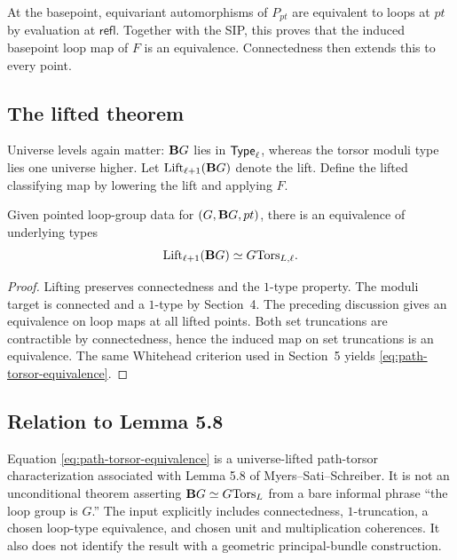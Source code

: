 At the basepoint, equivariant automorphisms of $P_{pt}$ are equivalent to loops at $pt$ by evaluation at $\mathsf{refl}$. Together with the SIP, this proves that the induced basepoint loop map of $F$ is an equivalence. Connectedness then extends this to every point.


\subsection{The lifted theorem}
Universe levels again matter: $\mathbf{B}G$ lies in $\mathsf{Type}_\ell$, whereas the torsor moduli type lies one universe higher. Let $\operatorname{Lift}_{\ell+1}(\mathbf{B}G)$ denote the lift. Define the lifted classifying map by lowering the lift and applying $F$.

\begin{theorem}
\label{thm:path-torsor}
Given pointed loop-group data for $(G,\mathbf{B}G,pt)$, there is an equivalence of underlying types
\begin{equation}
\operatorname{Lift}_{\ell+1}(\mathbf{B}G)\simeq G\mathrm{Tors}_{L,\ell}.
\label{eq:path-torsor-equivalence}
\end{equation}
\end{theorem}
\begin{proof}
Lifting preserves connectedness and the $1$-type property. The moduli target is connected and a $1$-type by Section~4. The preceding discussion gives an equivalence on loop maps at all lifted points. Both set truncations are contractible by connectedness, hence the induced map on set truncations is an equivalence. The same Whitehead criterion used in Section~5 yields \eqref{eq:path-torsor-equivalence}.
\end{proof}


\subsection{Relation to Lemma 5.8}
Equation \eqref{eq:path-torsor-equivalence} is a universe-lifted path-torsor characterization associated with Lemma 5.8 of Myers--Sati--Schreiber. It is not an unconditional theorem asserting $\mathbf{B}G\simeq G\mathrm{Tors}_{L}$ from a bare informal phrase ``the loop group is $G$.'' The input explicitly includes connectedness, $1$-truncation, a chosen loop-type equivalence, and chosen unit and multiplication coherences. It also does not identify the result with a geometric principal-bundle construction.

